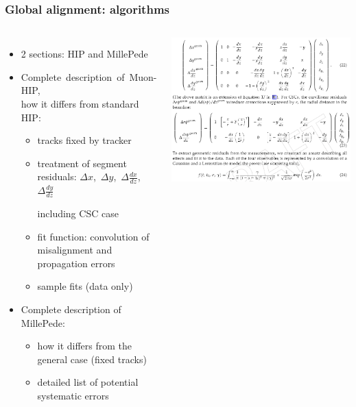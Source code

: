 \documentclass[compress]{beamer}
\begin{document}
\begin{frame}
\frametitle{Global alignment: algorithms}

\begin{columns}
\begin{itemize}
\item 2 sections: HIP and MillePede
\item \mbox{Complete description of Muon-HIP,\hspace{-1 cm}} \\ how it differs from standard HIP:
\begin{itemize}\setlength{\itemsep}{0.1 cm}
\item tracks fixed by tracker
\item treatment of segment residuals: \mbox{$\Delta x$, $\Delta y$, $\Delta \frac{dx}{dz}$, $\Delta \frac{dy}{dz}$\hspace{-1 cm}}

including CSC case

\item fit function: convolution of misalignment and propagation errors
\item sample fits (data only)
\end{itemize}

\item Complete description of MillePede:

\vspace{-0.2 cm}
\begin{itemize}
\item how it differs from the general case (fixed tracks)
\item detailed list of potential systematic errors
\end{itemize}
\end{itemize}

\includegraphics[width=\linewidth]{hipalgo.png}


\end{columns}
\end{frame}
\end{document}
